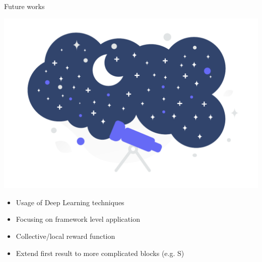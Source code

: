 \begin{frame}{\playfairblack Future works}
  \begin{backgroundblock} 
    \includegraphics[width=\paperwidth]{img/conclusion.pdf} 
  \end{backgroundblock} 
  \begin{card}
    \begin{itemize}  
      \item Usage of Deep Learning techniques
      \item Focusing on framework level application
      \item Collective/local reward function
      \item Extend first result to more complicated blocks (e.g. S)
    \end{itemize}
  \end{card}
\end{frame}